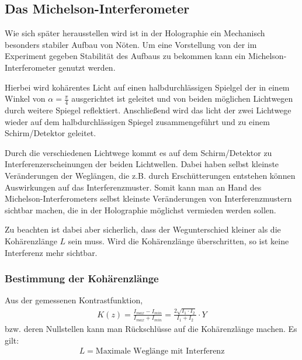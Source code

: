 \subsection{Das Michelson-Interferometer}
Wie sich später herausstellen wird ist in der Holographie ein Mechanisch besonders stabiler Aufbau von Nöten. Um eine Vorstellung von der im Experiment gegeben Stabilität des Aufbaus zu bekommen kann ein Michelson-Interferometer genutzt werden. 

Hierbei wird kohärentes Licht auf einen halbdurchlässigen Spielgel der in einem Winkel von $\alpha = \frac{\pi}{4}$ ausgerichtet ist geleitet und von beiden möglichen Lichtwegen durch weitere Spiegel reflektiert. Anschließend wird das licht der zwei Lichtwege wieder auf dem halbdurchlässigen Spiegel zusammengeführt und zu einem Schirm/Detektor geleitet.


Durch die verschiedenen Lichtwege kommt es auf dem Schirm/Detektor zu Interferenzerscheinungen der beiden Lichtwellen. Dabei haben selbst kleinste Veränderungen der Weglängen, die z.B. durch Erschütterungen entstehen können Auswirkungen auf das Interferenzmuster. Somit kann man an Hand des Michelson-Interferometers selbst kleinste Veränderungen von Interferenzmustern sichtbar machen, die in der Holographie möglichst vermieden werden sollen.

Zu beachten ist dabei aber sicherlich, dass der Wegunterschied kleiner als die Kohärenzlänge $L$ sein muss. Wird die Kohärenzlänge überschritten, so ist keine Interferenz mehr sichtbar.
\subsubsection{Bestimmung der Kohärenzlänge}
Aus der gemessenen Kontrastfunktion,
\begin{align}
K(z) = \frac{I_{max}-I_{min}}{I_{max}+I_{min}} = \frac{2\sqrt{I_1 \cdot I_2}}{I_1+I_2} \cdot Y
\end{align}
bzw. deren Nullstellen kann man Rückschlüsse auf die Kohärenzlänge machen. Es gilt:
\begin{align}
L = \text{Maximale Weglänge mit Interferenz}
\end{align}

\newpage

